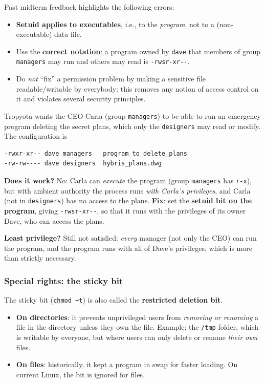 \begin{remark}
Past midterm feedback highlights the following errors:
\begin{itemize}
    \item \textbf{Setuid applies to executables}, i.e., to the \emph{program}, not to a (non-executable) data file.
    \item Use the \textbf{correct notation}: a program owned by \texttt{dave} that members of group \texttt{managers} may run and others may read is \texttt{-rwsr-xr-{}-}.
    \item Do \emph{not} ``fix'' a permission problem by making a sensitive file readable/writable by everybody: this removes any notion of access control on it and violates several security principles.
\end{itemize}
\end{remark}

\begin{example}
Tropyota wants the CEO Carla (group \texttt{managers}) to be able to run an emergency program deleting the secret plans, which only the \texttt{designers} may read or modify. The configuration is
\begin{verbatim}
-rwxr-xr-- dave managers   program_to_delete_plans
-rw-rw---- dave designers  hybris_plans.dwg
\end{verbatim}
\textbf{Does it work?} No: Carla can \emph{execute} the program (group \texttt{managers} has \texttt{r-x}), but with ambient authority the process runs \emph{with Carla's privileges}, and Carla (not in \texttt{designers}) has no access to the plans. \textbf{Fix}: set the \textbf{setuid bit on the program}, giving \texttt{-rwsr-xr-{}-}, so that it runs with the privileges of its owner Dave, who can access the plans.

\textbf{Least privilege?} Still not satisfied: \emph{every} manager (not only the CEO) can run the program, and the program runs with all of Dave's privileges, which is more than strictly necessary.
\end{example}

\subsubsection{Special rights: the sticky bit}

The sticky bit (\texttt{chmod +t}) is also called the \textbf{restricted deletion bit}.
\begin{itemize}
    \item \textbf{On directories}: it prevents unprivileged users from \emph{removing or renaming} a file in the directory unless they own the file. Example: the \texttt{/tmp} folder, which is writable by everyone, but where users can only delete or rename \emph{their own} files.
    \item \textbf{On files}: historically, it kept a program in swap for faster loading. On current Linux, the bit is ignored for files.
\end{itemize}

